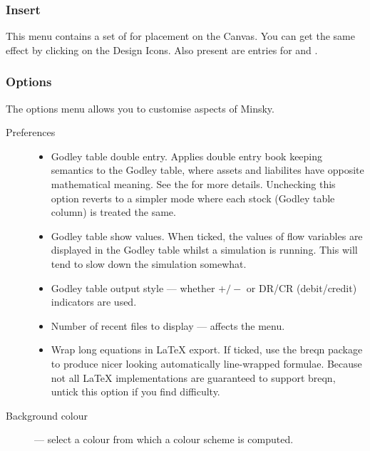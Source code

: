 \subsubsection{Insert}
\label{Insert}

This menu contains a set of  for placement on the Canvas. You can get the same
effect by clicking on the Design Icons. Also present are entries for
 and .


\subsubsection{Options}
\label{Options}

The options menu allows you to customise aspects of Minsky.

\begin{description}
\item[Preferences]\mbox{}

\begin{itemize}
\item Godley table double entry. Applies double entry book keeping
semantics to the Godley table, where assets and liabilites have
opposite mathematical meaning. See the  for more details. Unchecking this option reverts to a
simpler mode where each stock (Godley table column) is treated the
same.
\item Godley table show values. When ticked, the values of flow
variables are displayed in the Godley table whilst a simulation is
running. This will tend to slow down the simulation somewhat.
\item Godley table output style --- whether $+/-$ or DR/CR (debit/credit)
indicators are used.
\item Number of recent files to display --- affects the  menu.
\item\label{wrap-equations} Wrap long equations in LaTeX export. If ticked, use the breqn
package to produce nicer looking automatically line-wrapped
formulae. Because not all LaTeX implementations are guaranteed to
support breqn, untick this option if you find difficulty.
\end{itemize}

\item[Background colour] --- select a colour from which a colour scheme
is computed.

\end{description}

